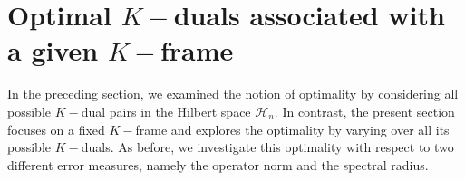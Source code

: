 \documentclass[final,1p,times]{elsarticle}
\begin{document}
	
	
	
%	

















	
	
	
	\section{\textbf{Optimal $K-$duals associated with a given $K-$frame}}
    
	In the preceding section, we examined the notion of optimality by considering all possible $K-$dual pairs in the Hilbert space $\mathcal{H}_n$. In contrast, the present section focuses on a fixed $K-$frame and explores the optimality by varying over all its possible $K-$duals. As before, we investigate this optimality with respect to two different error measures, namely the operator norm and the spectral radius.
\end{document}
